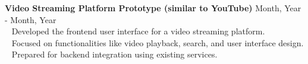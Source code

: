 {\textbf{Video Streaming Platform Prototype (similar to YouTube)}} \hfill {Month, Year - Month, Year} \\
\hspace*{4pt} \textbullet~ Developed the frontend user interface for a video streaming platform.\\
\hspace*{4pt} \textbullet~ Focused on functionalities like video playback, search, and user interface design.\\
\hspace*{4pt} \textbullet~ Prepared for backend integration using existing services.\\[4pt]
